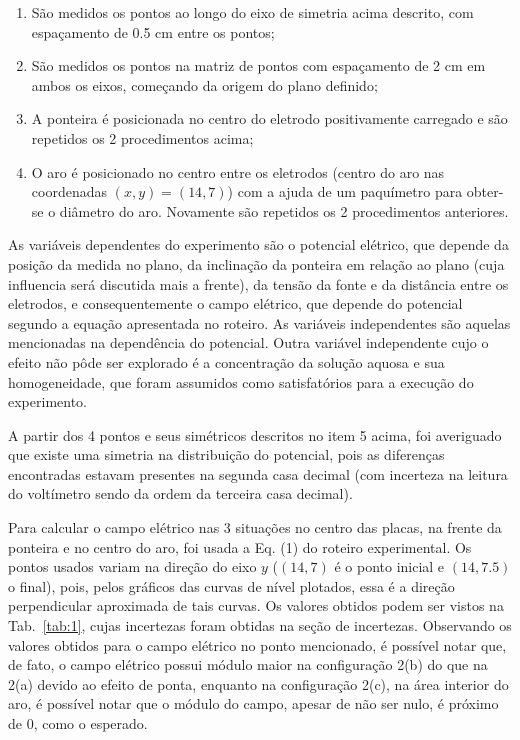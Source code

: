 \begin{enumerate}
    \item São medidos os pontos ao longo do eixo de simetria acima descrito, com espaçamento de 0.5 cm entre os pontos;
    \item São medidos os pontos na matriz de pontos com espaçamento de 2 cm em ambos os eixos, começando da origem do plano definido;
    \item A ponteira é posicionada no centro do eletrodo positivamente carregado e são repetidos os 2 procedimentos acima;
    \item O aro é posicionado no centro entre os eletrodos (centro do aro nas coordenadas  $(x, y)=(14, 7)$) com a ajuda de um paquímetro para obter-se o diâmetro do aro. Novamente são repetidos os 2 procedimentos anteriores.
\end{enumerate}

As variáveis dependentes do experimento são o potencial elétrico, que depende da posição da medida no plano, da inclinação da ponteira em relação ao plano (cuja influencia será discutida mais a frente), da tensão da fonte e da distância entre os eletrodos, e consequentemente o campo elétrico, que depende do potencial segundo a equação apresentada no roteiro. As variáveis independentes são aquelas mencionadas na dependência do potencial. Outra variável independente cujo o efeito não pôde ser explorado é a concentração da solução aquosa e sua homogeneidade, que foram assumidos como satisfatórios para a execução do experimento.

A partir dos 4 pontos e seus simétricos descritos no item 5 acima, foi averiguado que existe uma simetria na distribuição do potencial, pois as diferenças encontradas estavam presentes na segunda casa decimal (com incerteza na leitura do voltímetro sendo da ordem da terceira casa decimal).

Para calcular o campo elétrico nas 3 situações no centro das placas, na frente da ponteira e no centro do aro, foi usada a Eq. (1) do roteiro experimental. Os pontos usados variam na direção do eixo $y$ ($(14,7)$ é o ponto inicial e $(14,7.5)$ o final), pois, pelos gráficos das curvas de nível plotados, essa é a direção perpendicular aproximada de tais curvas. Os valores obtidos podem ser vistos na Tab.~\ref{tab:1}, cujas incertezas foram obtidas na seção de incertezas. Observando os valores obtidos para o campo elétrico no ponto mencionado, é possível notar que, de fato, o campo elétrico possui módulo maior na configuração 2(b) do que na 2(a) devido ao efeito de ponta, enquanto na configuração 2(c), na área interior do aro, é possível notar que o módulo do campo, apesar de não ser nulo, é próximo de 0, como o esperado.

